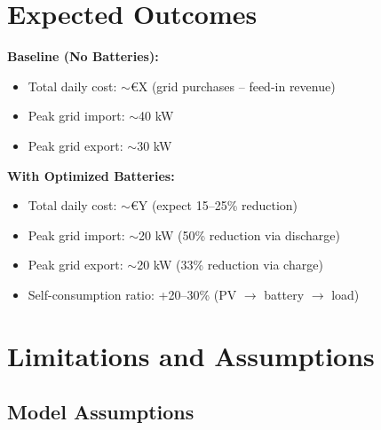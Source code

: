 \documentclass[11pt,a4paper]{article}
\begin{document}
\section{Expected Outcomes}

\textbf{Baseline (No Batteries):}
\begin{itemize}
    \item Total daily cost: $\sim$€X (grid purchases -- feed-in revenue)
    \item Peak grid import: $\sim$40 kW
    \item Peak grid export: $\sim$30 kW
\end{itemize}

\textbf{With Optimized Batteries:}
\begin{itemize}
    \item Total daily cost: $\sim$€Y (expect 15--25\% reduction)
    \item Peak grid import: $\sim$20 kW (50\% reduction via discharge)
    \item Peak grid export: $\sim$20 kW (33\% reduction via charge)
    \item Self-consumption ratio: +20--30\% (PV $\rightarrow$ battery $\rightarrow$ load)
\end{itemize}

\section{Limitations and Assumptions}

\subsection{Model Assumptions}
\end{document}
